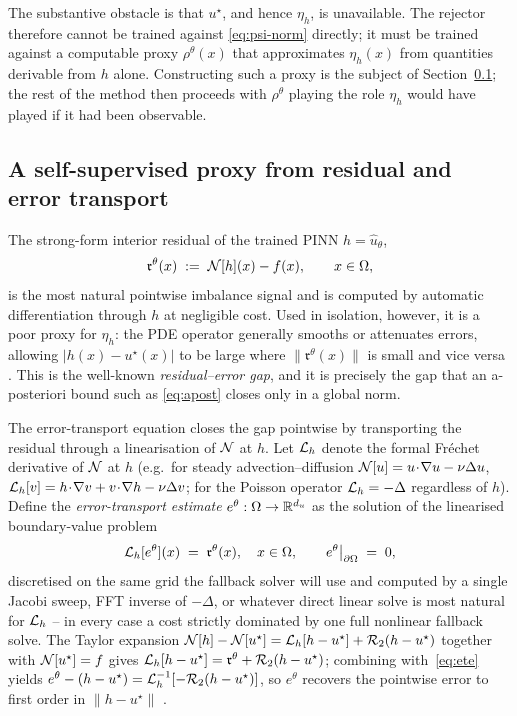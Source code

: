 The substantive obstacle is that $u^\star$, and hence $\eta_h$, is
unavailable. The rejector therefore cannot be trained against
\eqref{eq:psi-norm} directly; it must be trained against a computable
proxy $\rho^\theta(x)$ that approximates $\eta_h(x)$ from quantities
derivable from $h$ alone. Constructing such a proxy is the subject of
Section~\ref{sec:method-proxy}; the rest of the method then proceeds with
$\rho^\theta$ playing the role $\eta_h$ would have played if it had been
observable.

\subsection{A self-supervised proxy from residual and error transport}
\label{sec:method-proxy}

The strong-form interior residual of the trained PINN $h=\widehat{u}_\theta$,
\begin{equation*}
  \mathfrak{r}^\theta(x)\;:=\;\mathcal{N}[h](x)-f(x),\qquad x\in\Omega,
\end{equation*}
is the most natural pointwise imbalance signal and is computed by
automatic differentiation through $h$ at negligible cost. Used in
isolation, however, it is a poor proxy for $\eta_h$: the PDE operator
generally smooths or attenuates errors, allowing $|h(x)-u^\star(x)|$ to be
large where $\|\mathfrak{r}^\theta(x)\|$ is small and vice versa
\citep{verfurth2013posteriori,phillips2011residual}. This is the
well-known \emph{residual--error gap}, and it is precisely the gap that an
a-posteriori bound such as \eqref{eq:apost} closes only in a global norm.

The error-transport equation closes the gap pointwise by transporting the
residual through a linearisation of $\mathcal{N}$ at $h$. Let $\mathcal{L}_h$ denote
the formal Fr\'echet derivative of $\mathcal{N}$ at $h$ (e.g.\ for steady
advection--diffusion $\mathcal{N}[u]=u\!\cdot\!\nabla u-\nu\Delta u$,
$\mathcal{L}_h[v]=h\!\cdot\!\nabla v+v\!\cdot\!\nabla h-\nu\Delta v$;
for the Poisson operator $\mathcal{L}_h=-\Delta$ regardless of $h$). Define
the \emph{error-transport estimate} $e^\theta:\Omega\to\mathbb{R}^{d_u}$ as the
solution of the linearised boundary-value problem
\begin{equation}
  \mathcal{L}_h[e^\theta](x)\;=\;\mathfrak{r}^\theta(x),
  \quad x\in\Omega,
  \qquad
  e^\theta\big|_{\partial\Omega}\;=\;0,
  \label{eq:ete}
\end{equation}
discretised on the same grid the fallback solver will use and computed by
a single Jacobi sweep, FFT inverse of $-\Delta$, or whatever direct
linear solve is most natural for $\mathcal{L}_h$ -- in every case a cost
strictly dominated by one full nonlinear fallback solve. The Taylor
expansion $\mathcal{N}[h]-\mathcal{N}[u^\star]
=\mathcal{L}_h[h-u^\star]+\mathcal{R}_2(h-u^\star)$ together with $\mathcal{N}[u^\star]=f$
gives $\mathcal{L}_h[h-u^\star]=\mathfrak{r}^\theta+\mathcal{R}_2(h-u^\star)$; combining
with~\eqref{eq:ete} yields
$e^\theta-(h-u^\star)=\mathcal{L}_h^{-1}[-\mathcal{R}_2(h-u^\star)]$, so $e^\theta$
recovers the pointwise error to first order in $\|h-u^\star\|$
\citep{phillips2011residual}.

